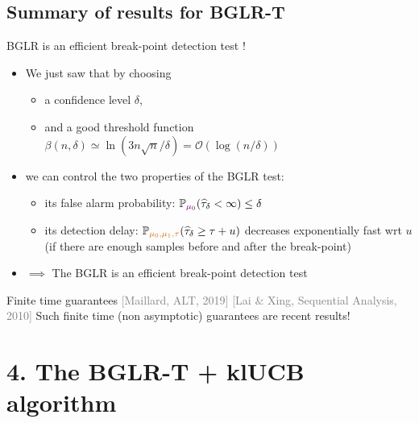 \documentclass[11pt,english,ignorenonframetext,]{beamer}
\providecommand{\tightlist}{%
  \setlength{\itemsep}{0pt}\setlength{\parskip}{0pt}}
\begin{document}
\subsection{\hfill{}Summary of results for BGLR-T\hfill{}}

\begin{frame}{BGLR is an efficient break-point detection test \dCooley{} !}

  \begin{itemize}
    \item
    We just saw that by choosing
    \begin{itemize}\tightlist
      \item
      a confidence level $\delta$,
      \item
      and a good threshold function $\beta(n,\delta) \simeq \ln(3n \sqrt{n}/\delta) = \mathcal{O}(\log(n/\delta))$
    \end{itemize}
    \pause
    \item
    we can control the two properties of the BGLR test:
    \begin{itemize}\tightlist
      \item
        its \alert{false alarm probability}:
        $\mathbb{P}_{\textcolor{darkpurple}{\mu_0}}(\widehat{\tau}_\delta < \infty) \leq \delta$
      \item
        its \alert{detection delay}:
        $\mathbb{P}_{\textcolor{gold}{\mu_0,\mu_1,\tau}} (\widehat{\tau}_{\delta} \geq \tau + u)$ decreases exponentially fast wrt $u$
        (if there are enough samples before and after the break-point)
    \end{itemize}

    \item
    $\implies$ The BGLR is an efficient break-point detection test \dCooley{}
  \end{itemize}

  \pause
  \begin{block}{Finite time guarantees \dCooley{} \hfill{} \tiny{\textcolor{gray}{[Maillard, ALT, 2019]} \textcolor{gray}{[Lai \& Xing, Sequential Analysis, 2010]}}}
    Such \alert{finite time} (non asymptotic) guarantees are recent results!
  \end{block}

\end{frame}

\section{\hfill{}4. The BGLR-T + klUCB algorithm\hfill{}}
\end{document}
